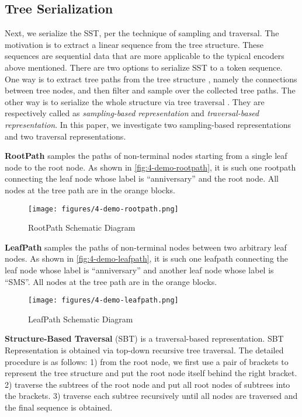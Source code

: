 \documentclass[conference]{IEEEtran}
\begin{document}
\subsection{Tree Serialization}
\label{subsec:serialization}

Next, we serialize the SST, per the technique of sampling and traversal. The motivation is to extract a linear sequence from the tree structure. These sequences are sequential data that are more applicable to the typical encoders above mentioned.
There are two options to serialize SST to a token sequence. One way is to extract tree paths from the tree structure \cite{Alon2018AGP,Kim2020CodePB}, namely the connections between tree nodes, and then filter and sample over the collected tree paths. The other way is to serialize the whole structure via tree traversal \cite{Hu2018DeepCC,Chen2018TreetotreeNN}. They are respectively called as \emph{sampling-based representation} and \emph{traversal-based representation}.
In this paper, we investigate two sampling-based representations and two traversal representations.

\textbf{RootPath} \cite{Alon2018AGP} samples the paths of non-terminal nodes starting from a single leaf node to the root node. As shown in \autoref{fig:4-demo-rootpath}, it is such one rootpath connecting the leaf node whose label is ``anniversary'' and the root node. All nodes at the tree path are in the orange blocks.

\begin{figure}[!htb]
  \centering
  \texttt{[image: figures/4-demo-rootpath.png]}
  \caption{RootPath Schematic Diagram}
  \label{fig:4-demo-rootpath}
\end{figure}

\textbf{LeafPath} \cite{Kim2020CodePB} samples the paths of non-terminal nodes between two arbitrary leaf nodes. As shown in \autoref{fig:4-demo-leafpath}, it is such one leafpath connecting the leaf node whose label is ``anniversary'' and another leaf node whose label is ``SMS''. All nodes at the tree path are in the orange blocks.

\begin{figure}[!htb]
  \centering
  \texttt{[image: figures/4-demo-leafpath.png]}
  \caption{LeafPath Schematic Diagram}
  \label{fig:4-demo-leafpath}
\end{figure}

\textbf{Structure-Based Traversal} (SBT) \cite{Hu2018DeepCC} is a traversal-based representation. SBT Representation is obtained via top-down recursive tree traversal. The detailed procedure is as follows: 1) from the root node, we first use a pair of brackets to represent the tree structure and put the root node itself behind the right bracket. 2) traverse the subtrees of the root node and put all root nodes of subtrees into the brackets. 3) traverse each subtree recursively until all nodes are traversed and the final sequence is obtained.
\end{document}
